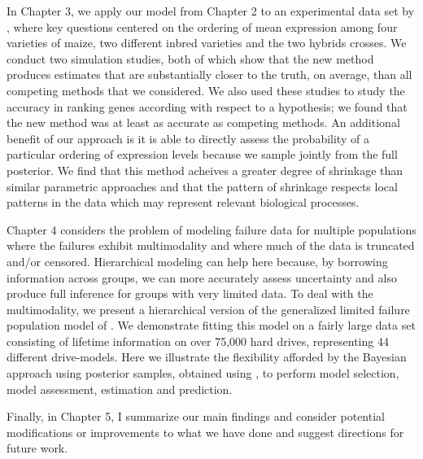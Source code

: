 In Chapter 3, we apply our model from Chapter 2 to an experimental data set by \citet{paschold}, where key questions centered on the ordering of mean expression among four varieties of maize, two different inbred varieties and the two hybrids crosses. We conduct two simulation studies, both of which show that the new method produces estimates that are substantially closer to the truth, on average, than all competing methods that we considered. We also used these studies to study the accuracy in ranking genes according with respect to a hypothesis; we found that the new method was at least as accurate as competing methods. An additional benefit of our approach is it is able to directly assess the probability of a particular ordering of expression levels because we sample jointly from the full posterior. We find that this method acheives a greater degree of shrinkage than similar parametric approaches and that the pattern of shrinkage respects local patterns in the data which may represent relevant biological processes.

Chapter 4 considers the problem of modeling failure data for multiple populations where the failures exhibit multimodality and where much of the data is truncated and/or censored. Hierarchical modeling can help here because, by borrowing information across groups, we can more accurately assess uncertainty and also produce full inference for groups with very limited data. To deal with the multimodality, we present a hierarchical version of the generalized limited failure population model of \citet{chan}. We demonstrate fitting this model on a fairly large data set consisting of lifetime information on over 75,000 hard drives, representing 44 different drive-models. Here we illustrate the flexibility afforded by the Bayesian approach using posterior samples, obtained using \citet{stan}, to perform model selection, model assessment, estimation and prediction.

Finally, in Chapter 5, I summarize our main findings and consider potential modifications or improvements to what we have done and suggest directions for future work.

